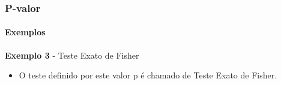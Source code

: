 \begin{frame}[c]
\frametitle{P-valor} 
\framesubtitle{Exemplos}
\begin{exampleblock}{\textbf{Exemplo 3} - Teste Exato de Fisher} %
\begin{itemize}
    \item  O teste definido por este valor p é chamado de Teste Exato de Fisher. 
\end{itemize}
\end{exampleblock}
\end{frame}